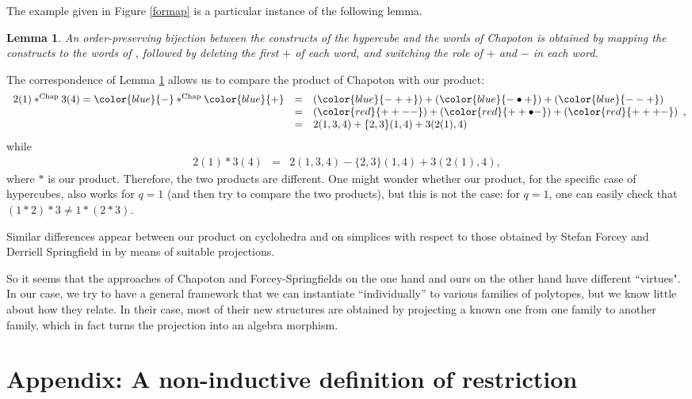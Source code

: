 \documentclass{article}
\theoremstyle{plain}
\newtheorem{lemma}[thm]{Lemma}
\theoremstyle{definition}
\begin{document}
The example given in Figure \ref{formap} is a particular instance of the following lemma.
\begin{lemma}\label{words}
An order-preserving bijection between the constructs of the hypercube and the words of Chapoton is obtained by mapping the constructs to the words of \cite[Example 3.4]{PLBJ1}, followed by deleting the first $+$ of each word, and switching the role of $+$ and $-$ in each word. 
\end{lemma}
The correspondence of Lemma \ref{words} allows us to compare  the product of Chapoton with our product: 
$$\begin{array}{rcl}
2(1)\ast^{\text{Chap}} 3(4)={\color{blue}{-}}\ast^{\text{Chap}}{\color{blue}{+}} & = &({\color{blue}{-++}})+({\color{blue}{-\bullet+}})+({\color{blue}{--+}})\\
& = & ({\color{red}{++--}})+({\color{red}{++\bullet-}})+({\color{red}{+++-}})\\
&=&2(1,3,4)+\{2,3\}(1,4)+3(2(1),4)\end{array},$$
while 
$$\begin{array}{rcl}
2(1)\ast 3(4)&=&2(1,3,4)-\{2,3\}(1,4)+3(2(1),4),\end{array}$$
where $\ast$ is our product. Therefore, the two products are different. One might wonder whether our product, for the specific case of hypercubes,  also works for $q=1$ (and then try to compare the  two products), but this is not the case: for $q=1$, one can easily check that  $(1\ast 2)\ast 3 \neq 1\ast (2\ast 3)$.

Similar differences appear between our product on cyclohedra and on simplices with respect to those  obtained by Stefan Forcey and Derriell Springfield in \cite{FS} by means of suitable projections.

\medskip
So it seems that the approaches of Chapoton and Forcey-Springfields on the one hand and ours on the other hand have different ``virtues". In our case, we try to have a general framework  that we can instantiate ``individually'' to various  families of polytopes, but we know little about how they relate. In their case, most of their new structures are obtained by projecting a known one from one family to another family, which in fact turns the projection into an algebra morphism.

 \section*{Appendix: A non-inductive definition of restriction}
\end{document}
